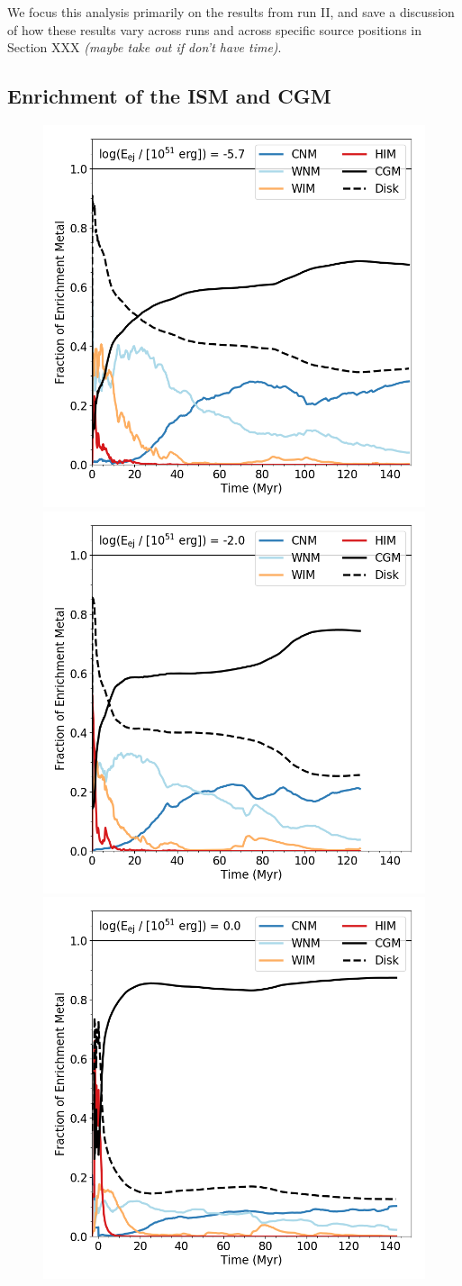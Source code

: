 We focus this analysis primarily on the results from run II, and save a discussion of how these results vary across runs and across specific source positions in Section XXX \textit{(maybe take out if don't have time)}.

\subsection{Enrichment of the ISM and CGM}
\label{ch4:sec:ISM CGM}

\begin{figure}
\centering
\includegraphics[width=0.45\linewidth]{figures/ch4/AGB1_enrichment_evolution_average_CGM}
\includegraphics[width=0.45\linewidth]{figures/ch4/NSNS1_enrichment_evolution_average_CGM} \\
\includegraphics[width=0.45\linewidth]{figures/ch4/SNE1_enrichment_evolution_average_CGM}

\end{figure}
